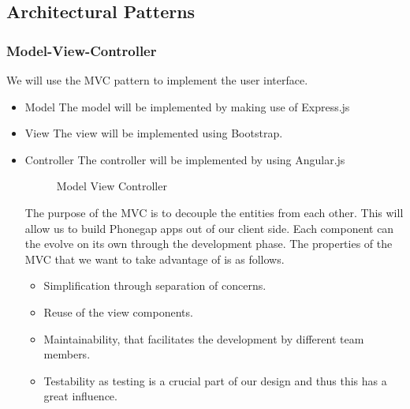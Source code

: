 \subsection{Architectural Patterns}
\subsubsection{Model-View-Controller}
We will use the MVC pattern to implement the user interface.
\begin{itemize}
	\item{Model}
	\newline
	The model will be implemented by making use of Express.js
	\item{View}
	\newline
	The view will be implemented using Bootstrap.
	\item{Controller}
	\newline
	The controller will be implemented by using Angular.js
	\begin{figure}[H]
	    	\centering
	    	\caption{Model View Controller}
	    	\label{fig:Learning rate 0.1}
   	\end{figure}
	The purpose of the MVC is to decouple the entities from each other. This will allow us to build Phonegap apps out of our client side. Each component can the evolve on its own through the development phase. 
	The properties of the MVC that we want to take advantage of is as follows.
	\begin{itemize}
		\item Simplification through separation of concerns.
		\item Reuse of the view components.
		\item Maintainability, that facilitates the development by different team members.
		\item Testability as testing is a crucial part of our design and thus this has a great influence.
	\end{itemize}
\end{itemize}